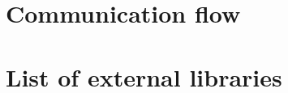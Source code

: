 \documentclass[Report.tex]{subfiles}
\begin{document}
\nocite{*} %
\printbibliography%
\clearpage

\begin{appendices}
\chapter{Communication flow}
  
\clearpage
\chapter{List of external libraries}
  \label{chap:libraries}
  
\end{appendices}
\end{document}

